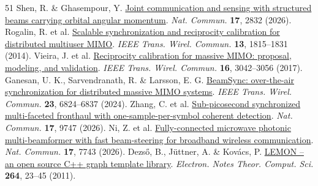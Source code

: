 \documentclass[10pt,letterpaper]{article}
\begin{document}
\begin{thebibliography}{51}
 Shen, R. \& Ghasempour, Y. \href{https://doi.org/10.1038/s41467-026-69493-y}{Joint communication and sensing with structured beams carrying orbital angular momentum}. \emph{Nat. Commun.} \textbf{17}, 2832 (2026).
 Rogalin, R. et al. \href{https://doi.org/10.1109/TWC.2014.030314.130474}{Scalable synchronization and reciprocity calibration for distributed multiuser MIMO}. \emph{IEEE Trans. Wirel. Commun.} \textbf{13}, 1815–1831 (2014).
 Vieira, J. et al. \href{https://doi.org/10.1109/TWC.2017.2674659}{Reciprocity calibration for massive MIMO: proposal, modeling, and validation}. \emph{IEEE Trans. Wirel. Commun.} \textbf{16}, 3042–3056 (2017).
 Ganesan, U. K., Sarvendranath, R. \& Larsson, E. G. \href{https://doi.org/10.1109/TWC.2023.3335089}{BeamSync: over-the-air synchronization for distributed massive MIMO systems}. \emph{IEEE Trans. Wirel. Commun.} \textbf{23}, 6824–6837 (2024).
 Zhang, C. et al. \href{https://doi.org/10.1038/s41467-026-76739-2}{Sub-picosecond synchronized multi-faceted fronthaul with one-sample-per-symbol coherent detection}. \emph{Nat. Commun.} \textbf{17}, 9747 (2026).
 Ni, Z. et al. \href{https://doi.org/10.1038/s41467-026-74485-z}{Fully-connected microwave photonic multi-beamformer with fast beam-steering for broadband wireless communication}. \emph{Nat. Commun.} \textbf{17}, 7743 (2026).
 Dezső, B., Jüttner, A. \& Kovács, P. \href{https://doi.org/10.1016/j.entcs.2011.06.003}{LEMON – an open source C++ graph template library}. \emph{Electron. Notes Theor. Comput. Sci.} \textbf{264}, 23–45 (2011).
\end{thebibliography}
\end{document}
